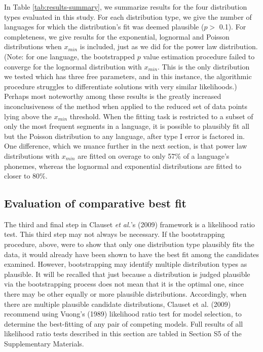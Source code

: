 In Table \ref{tab:results-summary}, we summarize results for the four distribution types evaluated in this study. For each distribution type, we give the number of languages for which the distribution's fit was deemed plausible (\(p >\) 0.1). For completeness, we give results for the exponential, lognormal and Poisson distributions when \(x_{min}\) is included, just as we did for the power law distribution. (Note: for one language, the bootstrapped \(p\) value estimation procedure failed to converge for the lognormal distribution with \(x_{min}\). This is the only distribution we tested which has three free parameters, and in this instance, the algorithmic procedure struggles to differentiate solutions with very similar likelihoods.) Perhaps most noteworthy among these results is the greatly increased inconclusiveness of the method when applied to the reduced set of data points lying above the \(x_{min}\) threshold. When the fitting task is restricted to a subset of only the most frequent segments in a language, it is possible to plausibly fit all but the Poisson distribution to any language, after type I error is factored in. One difference, which we nuance further in the next section, is that power law distributions with \(x_{min}\) are fitted on overage to only 57\% of a language's phonemes, whereas the lognormal and exponential distributions are fitted to closer to 80\%. \newline

\hypertarget{evaluation-of-comparative-best-fit}{%
\subsection*{Evaluation of comparative best fit}\label{evaluation-of-comparative-best-fit}}

The third and final step in Clauset \emph{et al.}'s (2009) framework is a likelihood ratio test. This third step may not always be necessary. If the bootstrapping procedure, above, were to show that only one distribution type plausibly fits the data, it would already have been shown to have the best fit among the candidates examined. However, bootstrapping may identify multiple distribution types as plausible. It will be recalled that just because a distribution is judged plausible via the bootstrapping process does not mean that it is the optimal one, since there may be other equally or more plausible distributions. Accordingly, when there are multiple plausible candidate distributions, Clauset et al. (2009) recommend using Vuong's (1989) likelihood ratio test for model selection, to determine the best-fitting of any pair of competing models. Full results of all likelihood ratio tests described in this section are tabled in Section S5 of the Supplementary Materials.

